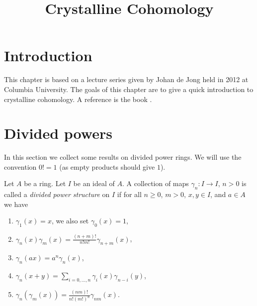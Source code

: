 

%


\title{Crystalline Cohomology}


\maketitle

\label{section-phantom}

\tableofcontents



\section{Introduction}
\label{section-introduction}

\noindent
This chapter is based on a lecture series given by Johan de Jong
held in 2012 at Columbia University.
The goals of this chapter are to give a quick introduction to
crystalline cohomology. A reference is the book \cite{Berthelot}.





\section{Divided powers}
\label{section-divided-powers}

\noindent
In this section we collect some results on divided power rings.
We will use the convention $0! = 1$ (as empty products should give $1$).

\begin{definition}
\label{definition-divided-powers}
Let $A$ be a ring. Let $I$ be an ideal of $A$. A collection of maps
$\gamma_n : I \to I$, $n > 0$ is called a {\it divided power structure}
on $I$ if for all $n \geq 0$, $m > 0$, $x, y \in I$, and $a \in A$ we have
\begin{enumerate}
\item $\gamma_1(x) = x$, we also set $\gamma_0(x) = 1$,
\item $\gamma_n(x)\gamma_m(x) = \frac{(n + m)!}{n! m!} \gamma_{n + m}(x)$,
\item $\gamma_n(ax) = a^n \gamma_n(x)$,
\item $\gamma_n(x + y) = \sum_{i = 0, \ldots, n} \gamma_i(x)\gamma_{n - i}(y)$,
\item $\gamma_n(\gamma_m(x)) = \frac{(nm)!}{n! (m!)^n} \gamma_{nm}(x)$.
\end{enumerate}
\end{definition}

